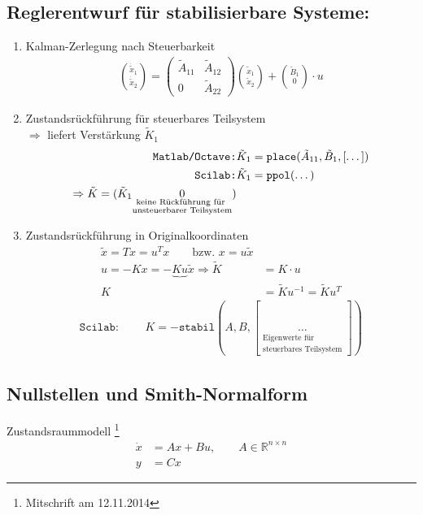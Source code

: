 \documentclass[ngerman]{tudscrreprt}
\begin{document}
\subsection*{Reglerentwurf für stabilisierbare Systeme:} 
\begin{enumerate}
\item Kalman-Zerlegung nach Steuerbarkeit
\begin{align*}
\binom{\dot{\tilde{x}}_1}{\dot{\tilde{x}}_2} = \begin{pmatrix} \tilde A_{11} & \tilde A_{12}\\ 0 & \tilde A_{22} \end{pmatrix} \binom{\tilde x_1}{\tilde x_2} + \binom{\tilde B_1}{0} \cdot u
\end{align*}
\item Zustandsrückführung für steuerbares Teilsystem\\ 
$\Rightarrow$ liefert Verstärkung $\tilde K_1$ \\ 
\begin{align*}
\text{\texttt{Matlab/Octave:}} & \tilde K_1 = \texttt{place}(\tilde A_{11}, \tilde B_1, [\dots])\\ 
\text{\texttt{Scilab:}} & \tilde K_1 = \texttt{ppol}(\dots) \\ 
\Rightarrow \tilde K = (\tilde K_1 \underset{\substack{\text{keine Rückführung für }\\ \text{unsteuerbarer Teilsystem}}}{0})
\end{align*}
\item Zustandsrückführung in Originalkoordinaten
\begin{align*}
\tilde x= Tx = u^T x \qquad \text{bzw. } x = u\tilde x \\ 
u = -Kx = -\underbrace{Ku}\tilde x\Rightarrow \tilde K &= K\cdot u\\ K &= \tilde K u^{-1} = \tilde K u^T
\end{align*}
\begin{align*}
\texttt{Scilab: } \qquad K = -\texttt{stabil}(A,B, [\underset{\substack{\text{Eigenwerte für}\\ \text{steuerbares Teilsystem} }}{\dots}])
\end{align*}
\end{enumerate}
\subsection{Nullstellen und Smith-Normalform}
Zustandsraummodell {\footnote{Mitschrift am 12.11.2014}} \begin{align*}
\dot x &= Ax + Bu, \qquad A\in\mathbb{R}^{n\times n}\\ 
y &= Cx
\end{align*}
\end{document}
